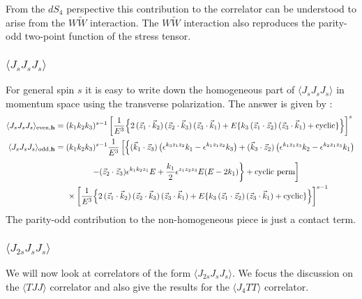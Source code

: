 \documentclass[a4paper,11pt]{article}
\begin{document}
From the $dS_4$ perspective this contribution to the correlator can be understood to arise from the $W\widetilde W$ interaction. The $W\widetilde W$  interaction also reproduces the  parity-odd two-point function of the stress tensor. 

\subsubsection*{$\langle J_s J_s J_s \rangle$}
For general spin $s$ it is easy to write down the homogeneous part of $\langle J_s J_s J_s \rangle$ in momentum space using the transverse polarization.
The answer is given by :
\begin{align}
   \langle J_sJ_sJ_s\rangle_{\text{even},\bf{h}}
&=(k_1 k_2 k_3)^{s-1}\left[\frac{1}{E^3} \Big\{2\,(\vec{z}_1\cdot \vec{k}_2) \, (\vec{z}_2\cdot \vec{k}_3) \, (\vec{z}_3\cdot \vec{k}_1)+E \{k_3\, (\vec{z}_1\cdot \vec{z}_2) \, (\vec{z}_3\cdot \vec{k}_1)+ \text{cyclic}\}\Big\}\right]^s\cr
\langle J_sJ_sJ_s\rangle_{\text{odd},\bf{h}}
&=(k_1 k_2 k_3)^{s-1}\frac{1}{E^3}\left[\left\{(\vec{k}_1 \cdot \vec{z}_3)\left(\epsilon^{k_3 z_1 z_2}k_1-\epsilon^{k_1 z_1 z_2}k_3\right)+(\vec{k}_3 \cdot \vec{z}_2)\left(\epsilon^{k_1 z_1 z_3}k_2-\epsilon^{k_2 z_1 z_3}k_1\right)\right.\right.\nonumber\\[5 pt]
&\hspace{1.5cm}\left.\left.-(\vec{z}_2 \cdot \vec{z}_3)\epsilon^{k_1 k_2 z_1}E+\frac{k_1}{2} \epsilon^{z_1 z_2 z_3}E(E-2k_1)\right\}+\text{cyclic perm}\right]\cr
&\hspace{.5cm}\times\left[\frac{1}{E^3} \Big\{2\,(\vec{z}_1\cdot \vec{k}_2) \, (\vec{z}_2\cdot \vec{k}_3) \, (\vec{z}_3\cdot \vec{k}_1)+E \{k_3\, (\vec{z}_1\cdot \vec{z}_2) \, (\vec{z}_3\cdot \vec{k}_1)+ \text{cyclic}\}\Big\}\right]^{s-1}
\end{align}
The parity-odd contribution to the non-homogeneous piece is just a contact term. 




\subsubsection{$\langle J_{2s}J_sJ_s \rangle$}
We will now look at correlators of the form $\langle J_{2s}J_sJ_s \rangle$. We focus the discussion on the $\langle TJJ \rangle$ correlator and also give the results for the $\langle J_4 TT \rangle$ correlator.
\end{document}
